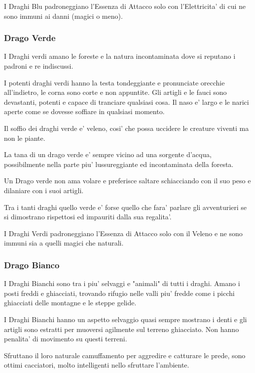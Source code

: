 \documentclass[a4paper,11pt,twoside,openany]{book}
\begin{document}
{I Draghi Blu padroneggiano l'Essenza di Attacco solo con l'Elettricita' di cui ne sono immuni ai danni (magici o meno).


\subsubsection{Drago Verde} 

I Draghi verdi amano le foreste e la natura incontaminata dove si reputano i padroni e re indiscussi.

I potenti draghi verdi hanno la testa tondeggiante e pronunciate orecchie all'indietro, le corna sono corte e non appuntite.
Gli artigli e le fauci sono devastanti, potenti e capace di tranciare qualsiasi cosa.
Il naso e' largo e le narici aperte come se dovesse soffiare in qualsiasi momento.

Il soffio dei draghi verde e' veleno, cosi' che possa uccidere le creature viventi ma non le piante.

La tana di un drago verde e' sempre vicino ad una sorgente d'acqua, possibilmente nella parte piu' lussureggiante ed incontaminata della foresta.

Un Drago verde non ama volare e preferisce saltare schiacciando con il suo peso e dilaniare con i suoi artigli.

Tra i tanti draghi quello verde e' forse quello che fara' parlare gli avventurieri se si dimostrano rispettosi ed impauriti dalla sua regalita'.

I Draghi Verdi padroneggiano l'Essenza di Attacco solo con il Veleno e ne sono immuni sia a quelli magici che naturali.

\subsubsection{Drago Bianco} 

I Draghi Bianchi sono tra i piu' selvaggi e "animali" di tutti i draghi.
Amano i posti freddi e ghiacciati, trovando rifugio nelle valli piu' fredde come i picchi ghiacciati delle montagne e le steppe gelide.

I Draghi Bianchi hanno un aspetto selvaggio quasi sempre mostrano i denti e gli artigli sono estratti per muoversi agilmente sul terreno ghiacciato.
Non hanno penalita' di movimento su questi terreni.

Sfruttano il loro naturale camuffamento per aggredire e catturare le prede, sono ottimi cacciatori, molto intelligenti nello sfruttare l'ambiente.

}
\end{document}

